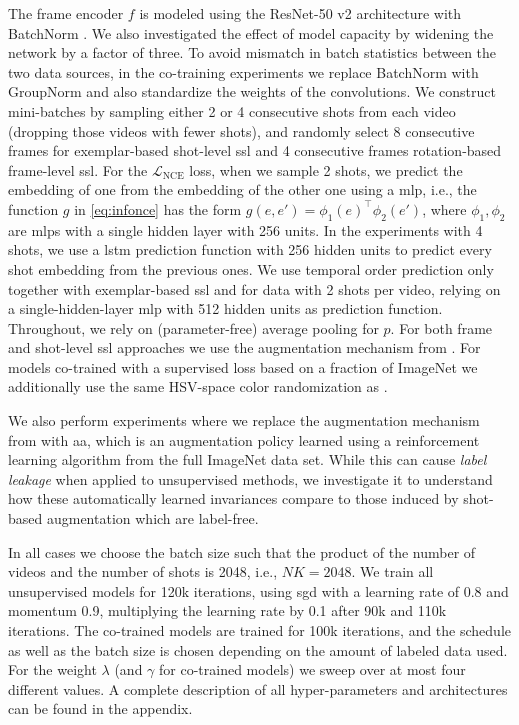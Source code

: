 \documentclass[10pt,twocolumn,letterpaper]{article}
\newcommand{\Lnce}{\mathcal L_\text{NCE}}
\renewcommand{\paragraph}[1]{\noindent{\bf #1}\quad}
\begin{document}
\paragraph{Architectures and training details} The frame encoder $f$ is modeled using the ResNet-50 v2 \cite{he2016identity} architecture with BatchNorm \cite{ioffe2015batch}.
We also investigated the effect of model capacity by widening the network by a factor of three.
To avoid mismatch in batch statistics between the two data sources, in the co-training experiments we replace BatchNorm with GroupNorm \cite{wu2018group} and also standardize \cite{qiao2019weight} the weights of the convolutions.
We construct mini-batches by sampling either 2 or 4 consecutive shots from each video (dropping those videos with fewer shots),
and randomly select 8 consecutive frames for exemplar-based shot-level \gls{ssl} and 4 consecutive frames rotation-based frame-level \gls{ssl}.
For the $\Lnce$ loss, when we sample 2 shots, we predict the embedding of one from the embedding of the other one using a \gls{mlp}, i.e., the function $g$ in \eqref{eq:infonce} has the form $g(e,e')=\phi_1(e)^\top \phi_2(e')$, where $\phi_1, \phi_2$ are \glspl{mlp} with a single hidden layer with 256 units.
In the experiments with 4 shots, we use a \gls{lstm} prediction function with 256 hidden units to predict every shot embedding from the previous ones.
We use temporal order prediction only together with exemplar-based \gls{ssl} and for data with 2 shots per video, relying on a single-hidden-layer \gls{mlp} with 512 hidden units as prediction function.
Throughout, we rely on (parameter-free) average pooling for $p$. For both frame and shot-level \gls{ssl} approaches we use the augmentation mechanism from \cite{szegedy2015going}. For models co-trained with a supervised loss based on a fraction of ImageNet we additionally use the same HSV-space color randomization as \cite{zhai2019s4l}.

We also perform experiments where we replace the augmentation mechanism from \cite{szegedy2015going} with \gls{aa}, which is an augmentation policy learned using a reinforcement learning algorithm from the full ImageNet data set. While this can cause \emph{label leakage} when applied to unsupervised methods, we investigate it to understand how these automatically learned invariances compare to those induced by shot-based augmentation which are label-free.


In all cases we choose the batch size such that the product of the number of videos and the number of shots is 2048, i.e., $NK = 2048$. We train all unsupervised models for 120k iterations, using \gls{sgd} with a learning rate of 0.8 and momentum 0.9, multiplying the learning rate by 0.1 after 90k and 110k iterations. The co-trained models are trained for 100k iterations, and the schedule as well as the batch size is chosen depending on the amount of labeled data used. For the weight $\lambda$ (and $\gamma$ for co-trained models) we sweep over at most four different values. A complete description of all hyper-parameters and architectures can be found in the appendix.
\end{document}
